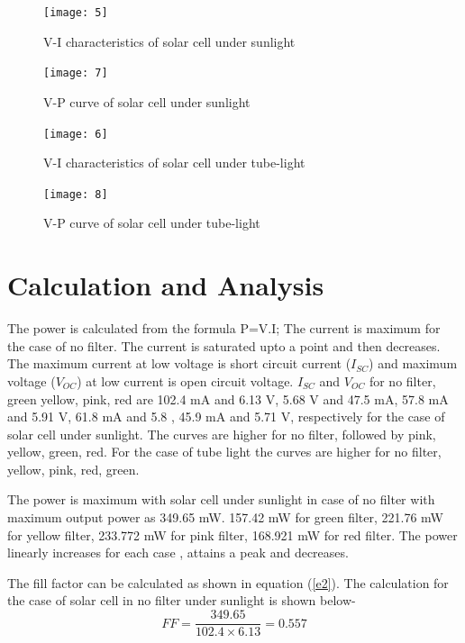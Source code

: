 \documentclass[a4paper, amsfonts, amssymb, amsmath, reprint, showkeys, nofootinbib, twoside]{revtex4-1}
\begin{document}
\begin{figure}[H]
	\centering
	\texttt{[image: 5]}
	\caption{V-I characteristics of solar cell under sunlight}
	\label{visun}
\end{figure}

\begin{figure}[H]
	\centering
	\texttt{[image: 7]}
	\caption{V-P curve of solar cell under sunlight}
	\label{vpsun}
\end{figure}

\begin{figure}[H]
	\centering
	\texttt{[image: 6]}
	\caption{V-I characteristics of solar cell under tube-light}
	\label{vitube}
\end{figure}

\begin{figure}[H]
	\centering
	\texttt{[image: 8]}
	\caption{V-P curve of solar cell under tube-light}
	\label{vptube}
\end{figure}

\section{Calculation and Analysis}
The power is calculated from the formula P=V.I; The current is maximum for the case of no filter. The current is saturated upto a point and then decreases. The maximum current at low voltage is short circuit current ($I_{SC}$) and maximum voltage ($V_{OC}$) at low current is open circuit voltage. $I_{SC}$ and $V_{OC}$ for no filter, green yellow, pink, red are 102.4 mA and 6.13 V, 5.68 V and 47.5 mA, 57.8 mA and 5.91 V, 61.8 mA and 5.8 , 45.9 mA and 5.71 V, respectively for the case of solar cell under sunlight. The curves are higher for no filter, followed by pink, yellow, green, red. For the case of tube light the curves are higher for no filter, yellow, pink, red, green. 

The power is maximum with solar cell under sunlight in case of no filter with maximum output power as 349.65 mW.  157.42 mW for green filter, 221.76 mW for yellow filter, 233.772 mW for pink filter, 168.921 mW for red filter. The power linearly increases for each case , attains a peak and decreases. 

The fill factor can be calculated as shown in equation (\ref{e2}). The calculation for the case of solar cell in no filter under sunlight is shown below-
\begin{equation}
	FF=\frac{349.65}{102.4\times6.13}=0.557
\end{equation}
\end{document}
